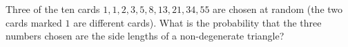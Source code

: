Three of the ten cards $1,1,2,3,5,8,13,21,34,55$ are chosen at random (the two cards marked $1$ are different cards). What is the probability that the three numbers chosen are the side lengths of a non-degenerate triangle?
